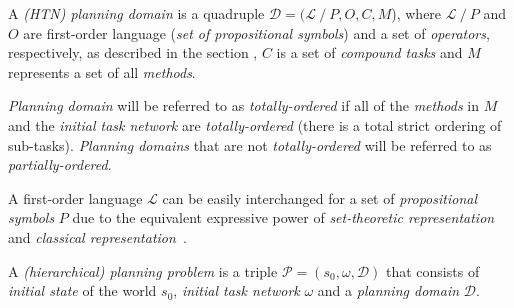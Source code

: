 \begin{defn}\label{def02:11}
    A \emph{(HTN) planning domain} is a quadruple $\mathcal{D} = (\mathcal{L} \ / \ P, O, C, M$), where $\mathcal{L} \ / \ P$ and $O$ are first-order language (\emph{set of propositional symbols}) and a set of \emph{operators}, respectively, as described in the section , $C$ is a set of \emph{compound tasks} and $M$ represents a set of all \emph{methods}.

    \noindent
    \emph{Planning domain} will be referred to as \emph{totally-ordered} if all of the \emph{methods} in $M$ and the \emph{initial task network} are \emph{totally-ordered} (there is a total strict ordering of sub-tasks). \emph{Planning domains} that are not \emph{totally-ordered} will be referred to as \emph{partially-ordered}.
\end{defn}

\medskip\noindent
A first-order language $\mathcal{L}$ can be easily interchanged for a set of \emph{propositional symbols} $P$ due to the equivalent expressive power of \emph{set-theoretic representation} and \emph{classical representation}~\cite{nau}.

\begin{defn}\label{def02:12}
    A \emph{(hierarchical) planning problem} is a triple $\mathcal{P} = (s_0,\omega,\mathcal{D})$ that consists of \emph{initial state} of the world $s_0$, \emph{initial task network} $\omega$ and a \emph{planning domain} $\mathcal{D}$.
\end{defn}

